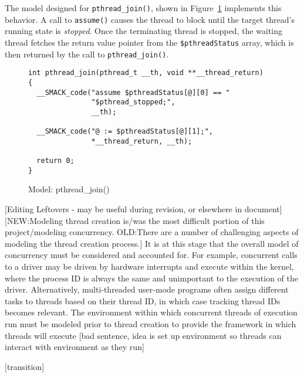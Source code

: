 The model designed for \lstinline|pthread_join()|, shown in
Figure~\ref{fig:pthread_join} implements this behavior.  A call to
\lstinline|assume()| causes the thread to block until the target
thread's running state is \emph{stopped}.  Once the terminating thread
is stopped, the waiting thread fetches the return value pointer from
the \lstinline|$pthreadStatus| array, which is then returned by the
call to \lstinline|pthread_join()|.

\begin{figure}[h]
\centering
\caption{Model: pthread\_join()}\label{fig:pthread_join}
\begin{lstlisting}
int pthread_join(pthread_t __th, void **__thread_return)
{
  __SMACK_code("assume $pthreadStatus[@][0] == "
               "$pthread_stopped;",
               __th);

  __SMACK_code("@ := $pthreadStatus[@][1];",
               *__thread_return, __th);

  return 0;
}

\end{lstlisting}
\end{figure}



[Editing Leftovers - may be useful during revision, or elsewhere in
document] 
[NEW:Modeling thread creation is/was the most difficult portion of
this project/modeling concurrency.  OLD:There are a number of
challenging aspects of modeling the thread creation process.]  It is
at this stage that the overall model of 
concurrency must be considered and accounted for.  For example,
concurrent calls to a driver may be driven by hardware interrupts and
execute within the kernel, where the process ID is always the same and
unimportant to the execution of the driver.  Alternatively,
multi-threaded user-mode programs often assign different tasks to
threads based on their thread ID, in which case tracking thread IDs
becomes relevant.  The environment within which concurrent threads of
execution run must be modeled prior to thread creation to provide the
framework in which threads will execute [bad sentence, idea is set up
environment so threads can interact with environment as they run] 

[transition]


